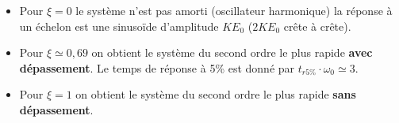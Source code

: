 \begin{resultat}
\begin{itemize}
\item Pour $\xi=0$ le système n'est pas amorti (oscillateur harmonique) la réponse à un échelon est une sinusoïde d'amplitude $KE_0$ ($2KE_0$ crête à crête).  
\item Pour $\xi\simeq 0,69$  on obtient le système du second ordre le plus rapide \textbf{avec dépassement}. 
Le temps de réponse à 5\% est donné par $t_{r 5\%} \cdot \omega_0 \simeq 3$.
\item Pour $\xi =1$ on obtient le système du second ordre le plus rapide \textbf{sans dépassement}.

\end{itemize}
\end{resultat}
%
%
%
%
%
%
%
%
%
